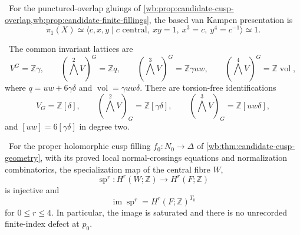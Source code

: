 
\begin{proposition}
\label{mapsI:top:prop:geometric-pi1}
\ For the punctured-overlap gluings of
\cref{wb:prop:candidate-cusp-overlap,wb:prop:candidate-finite-fillings}, the based
van Kampen presentation is
\[
 \pi_1(X)\simeq
 \langle c,x,y\mid c\text{ central},\ xy=1,\ x^3=c,\ y^4=c^{-1}\rangle
 \simeq1.
\tag{IL.5.24}
\]
\end{proposition}

\begin{theorem}\label{wb:thm:coinvariants}
\ The common invariant lattices are
\[
 V^G=\mathbb Z\gamma,\qquad
 (\textstyle\bigwedge^2V)^G=\mathbb Zq,\qquad
 (\textstyle\bigwedge^3V)^G=\mathbb Z\gamma uw,\qquad
 (\textstyle\bigwedge^4V)^G=\mathbb Z\operatorname{vol},
\]
where $q=uw+6\gamma\delta$ and
$\operatorname{vol}=\gamma uw\delta$.  There are torsion-free
identifications
\[
V_G=\mathbb Z[\delta],\qquad
(\textstyle\bigwedge^2V)_G=\mathbb Z[\gamma\delta],
\qquad
(\textstyle\bigwedge^3V)_G=\mathbb Z[uw\delta],
\tag{3.5}
\]
and $[uw]=6[\gamma\delta]$ in degree two.
\end{theorem}

\begin{theorem}
\label{mapsI:top:thm:p0-integral-specialization}
\ For the proper holomorphic cusp filling
\(f_0:N_0\to\Delta\) of \cref{wb:thm:candidate-cusp-geometry}, with its
proved local normal-crossings equations and normalization combinatorics,
the specialization map of the central fibre \(W\),
\[
 \operatorname{sp}^r:H^r(W;\mathbb Z)\longrightarrow H^r(F;\mathbb Z)
\]
is injective and
\[
 \operatorname{im}\operatorname{sp}^r
 =H^r(F;\mathbb Z)^{T_0}
\tag{IL.5.1}
\]
for \(0\le r\le4\).  In particular, the image is saturated and there is no
unrecorded finite-index defect at \(p_0\).
\end{theorem}


